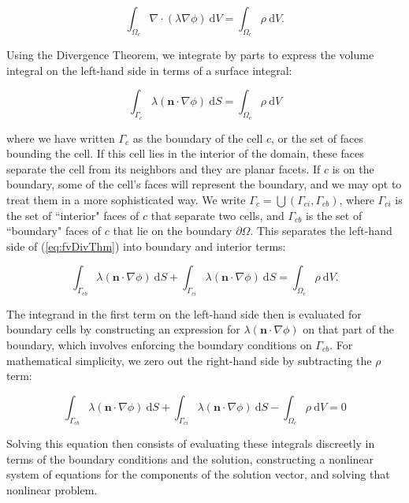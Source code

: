 \documentclass[12pt]{article}
\newcommand{\labelEq}[1]{\label{eq:#1}}
\newcommand{\refEq}[1]{(\ref{eq:#1})}
\renewcommand{\vec}[1]{\mathbf{#1}}
\newcommand{\diverg}[1]{\nabla\cdot#1}
\newcommand{\grad}[1]{\nabla#1}
\newcommand{\dV}{~\mathrm{d}V}
\newcommand{\dS}{~\mathrm{d}S}
\begin{document}
\begin{equation}
\int_{\Omega_c} \diverg(\lambda \grad{\phi}) \dV = \int_{\Omega_c} \rho \dV.
\end{equation}

Using the Divergence Theorem, we integrate by parts to express the volume 
integral on the left-hand side in terms of a surface integral:

\begin{equation}
\int_{\Gamma_c} \lambda (\vec{n}\cdot\grad{\phi}) \dS = \int_{\Omega_c} \rho \dV \labelEq{fvDivThm}
\end{equation}

\noindent
where we have written $\Gamma_c$ as the boundary of the cell $c$, or the set 
of faces bounding the cell. If this cell lies in the interior of the domain, 
these faces separate the cell from its neighbors and they are planar facets. 
If $c$ is on the boundary, some of the cell's faces will represent the boundary, 
and we may opt to treat them in a more sophisticated way. We write 
$\Gamma_c = \bigcup(\Gamma_{ci}, \Gamma_{cb})$, where $\Gamma_{ci}$ is the set of 
``interior" faces of $c$ that separate two cells, and $\Gamma_{cb}$ is the set
of ``boundary" faces of $c$ that lie on the boundary $\partial\Omega$. This separates 
the left-hand side of \refEq{fvDivThm} into boundary and interior terms:

\begin{equation}
\int_{\Gamma_{cb}} \lambda (\vec{n}\cdot\grad{\phi}) \dS + 
\int_{\Gamma_{ci}} \lambda (\vec{n}\cdot\grad{\phi}) \dS = \int_{\Omega_c} \rho \dV. 
\end{equation}

\noindent
The integrand in the first term on the left-hand side then is evaluated for 
boundary cells by constructing an expression for $\lambda (\vec{n}\cdot\grad{\phi})$ on that 
part of the boundary, which involves enforcing the boundary conditions on $\Gamma_{cb}$. For mathematical
simplicity, we zero out the right-hand side by subtracting the $\rho$ term:

\begin{equation}
\int_{\Gamma_{cb}} \lambda (\vec{n}\cdot\grad{\phi}) \dS + 
\int_{\Gamma_{ci}} \lambda (\vec{n}\cdot\grad{\phi}) \dS - \int_{\Omega_c} \rho \dV = 0 \labelEq{fvContEq}
\end{equation}

\noindent
Solving this equation then consists of evaluating these integrals discreetly in terms of the 
boundary conditions and the solution, constructing a nonlinear system of equations for 
the components of the solution vector, and solving that nonlinear problem.
\end{document}
